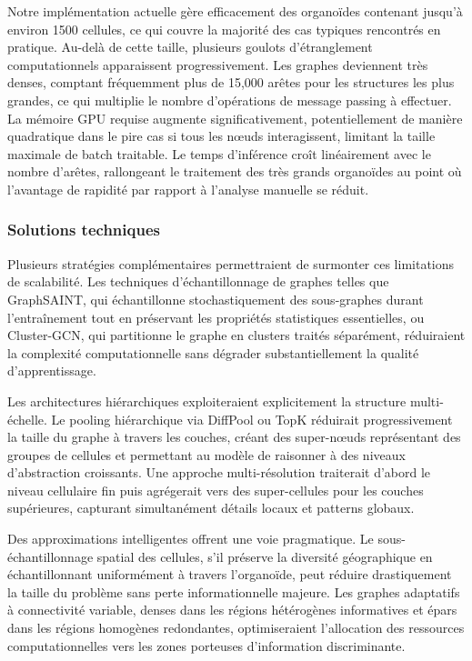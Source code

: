 Notre implémentation actuelle gère efficacement des organoïdes contenant jusqu'à environ 1500 cellules, ce qui couvre la majorité des cas typiques rencontrés en pratique. Au-delà de cette taille, plusieurs goulots d'étranglement computationnels apparaissent progressivement. Les graphes deviennent très denses, comptant fréquemment plus de 15,000 arêtes pour les structures les plus grandes, ce qui multiplie le nombre d'opérations de message passing à effectuer. La mémoire GPU requise augmente significativement, potentiellement de manière quadratique dans le pire cas si tous les nœuds interagissent, limitant la taille maximale de batch traitable. Le temps d'inférence croît linéairement avec le nombre d'arêtes, rallongeant le traitement des très grands organoïdes au point où l'avantage de rapidité par rapport à l'analyse manuelle se réduit.

\subsubsection{Solutions techniques}

Plusieurs stratégies complémentaires permettraient de surmonter ces limitations de scalabilité. Les techniques d'échantillonnage de graphes telles que GraphSAINT, qui échantillonne stochastiquement des sous-graphes durant l'entraînement tout en préservant les propriétés statistiques essentielles, ou Cluster-GCN, qui partitionne le graphe en clusters traités séparément, réduiraient la complexité computationnelle sans dégrader substantiellement la qualité d'apprentissage.

Les architectures hiérarchiques exploiteraient explicitement la structure multi-échelle. Le pooling hiérarchique via DiffPool ou TopK réduirait progressivement la taille du graphe à travers les couches, créant des super-nœuds représentant des groupes de cellules et permettant au modèle de raisonner à des niveaux d'abstraction croissants. Une approche multi-résolution traiterait d'abord le niveau cellulaire fin puis agrégerait vers des super-cellules pour les couches supérieures, capturant simultanément détails locaux et patterns globaux.

Des approximations intelligentes offrent une voie pragmatique. Le sous-échantillonnage spatial des cellules, s'il préserve la diversité géographique en échantillonnant uniformément à travers l'organoïde, peut réduire drastiquement la taille du problème sans perte informationnelle majeure. Les graphes adaptatifs à connectivité variable, denses dans les régions hétérogènes informatives et épars dans les régions homogènes redondantes, optimiseraient l'allocation des ressources computationnelles vers les zones porteuses d'information discriminante.

